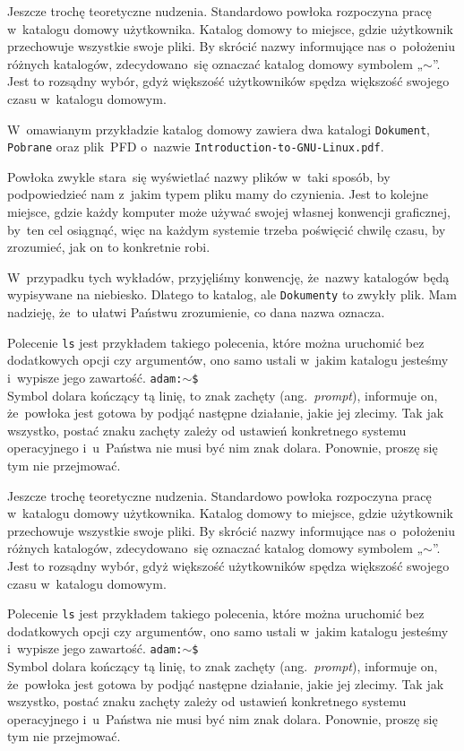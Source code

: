 \documentclass[10pt,t]{beamer}
\begin{document}
\begin{frame}
  Jeszcze trochę teoretyczne nudzenia. Standardowo powłoka rozpoczyna pracę
  w~katalogu domowy użytkownika. Katalog domowy to miejsce, gdzie użytkownik
  przechowuje wszystkie swoje pliki. By skrócić nazwy informujące nas
  o~położeniu różnych katalogów, zdecydowano~się oznaczać katalog domowy
  symbolem „$\sim$”. Jest to rozsądny wybór, gdyż większość użytkowników
  spędza większość swojego czasu w~katalogu domowym.



  W~omawianym przykładzie katalog domowy zawiera dwa katalogi
  \texttt{Dokument}, \texttt{Pobrane} oraz plik~PFD o~nazwie
  \texttt{Introduction-to-GNU-Linux.pdf}.

  Powłoka zwykle stara~się wyświetlać nazwy plików w~taki sposób, by
  podpowiedzieć nam z~jakim typem pliku mamy do czynienia. Jest to kolejne
  miejsce, gdzie każdy komputer może używać swojej własnej konwencji
  graficznej, by~ten cel osiągnąć, więc na każdym systemie trzeba poświęcić
  chwilę czasu, by zrozumieć, jak on to konkretnie robi.

  W~przypadku tych wykładów, przyjęliśmy konwencję, że~nazwy katalogów
  będą wypisywane na niebiesko. Dlatego \texttt{}
  to katalog, ale \texttt{Dokumenty} to zwykły plik. Mam nadzieję, że~to
  ułatwi Państwu zrozumienie, co dana nazwa oznacza.



  Polecenie \texttt{ls} jest przykładem takiego polecenia, które można
  uruchomić bez dodatkowych opcji czy argumentów, ono samo ustali w~jakim
  katalogu jesteśmy i~wypisze jego zawartość.
  \texttt{adam:$\sim$\$} \\
  Symbol dolara kończący tą linię, to znak zachęty (ang.~\textit{prompt}),
  informuje on, że~powłoka jest gotowa by podjąć następne działanie, jakie
  jej zlecimy. Tak jak wszystko, postać znaku zachęty zależy od ustawień
  konkretnego systemu operacyjnego i~u~Państwa nie musi być nim znak dolara.
  Ponownie, proszę się tym nie przejmować.

  Jeszcze trochę teoretyczne nudzenia. Standardowo powłoka rozpoczyna pracę
  w~katalogu domowy użytkownika. Katalog domowy to miejsce, gdzie użytkownik
  przechowuje wszystkie swoje pliki. By skrócić nazwy informujące nas
  o~położeniu różnych katalogów, zdecydowano~się oznaczać katalog domowy
  symbolem „$\sim$”. Jest to rozsądny wybór, gdyż większość użytkowników
  spędza większość swojego czasu w~katalogu domowym.

  Polecenie \texttt{ls} jest przykładem takiego polecenia, które można
  uruchomić bez dodatkowych opcji czy argumentów, ono samo ustali w~jakim
  katalogu jesteśmy i~wypisze jego zawartość.
  \texttt{adam:$\sim$\$} \\
  Symbol dolara kończący tą linię, to znak zachęty (ang.~\textit{prompt}),
  informuje on, że~powłoka jest gotowa by podjąć następne działanie, jakie
  jej zlecimy. Tak jak wszystko, postać znaku zachęty zależy od ustawień
  konkretnego systemu operacyjnego i~u~Państwa nie musi być nim znak dolara.
  Ponownie, proszę się tym nie przejmować.


\end{frame}
\end{document}
